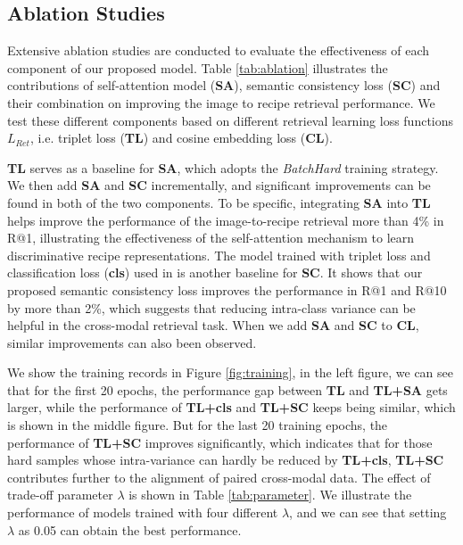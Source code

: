 \documentclass[journal]{IEEEtran}
\begin{document}
\subsection{Ablation Studies}
Extensive ablation studies are conducted to evaluate the effectiveness of each component of our proposed model. Table \ref{tab:ablation} illustrates the contributions of self-attention model (\textbf{SA}), semantic consistency loss (\textbf{SC}) and their combination on improving the image to recipe retrieval performance. We test these different components based on different retrieval learning loss functions $L_{Ret}$, i.e. triplet loss (\textbf{TL}) and cosine embedding loss (\textbf{CL}). 

\textbf{TL} serves as a baseline for \textbf{SA}, which adopts the \emph{BatchHard} \cite{hermans2017defense} training strategy. We then add \textbf{SA} and \textbf{SC} incrementally, and significant improvements can be found in both of the two components. To be specific, integrating \textbf{SA} into \textbf{TL} helps improve the performance of the image-to-recipe retrieval more than 4\% in R@1, illustrating the effectiveness of the self-attention mechanism to learn discriminative recipe representations. The model trained with triplet loss and classification loss (\textbf{cls}) used in \cite{salvador2017learning} is another baseline for \textbf{SC}. It shows that our proposed semantic consistency loss improves the performance in R@1 and R@10 by more than 2\%, which suggests that reducing intra-class variance can be helpful in the cross-modal retrieval task. When we add \textbf{SA} and \textbf{SC} to \textbf{CL}, similar improvements can also been observed.

We show the training records in Figure \ref{fig:training}, in the left figure, we can see that for the first 20 epochs, the performance gap between \textbf{TL} and \textbf{TL+SA} gets larger, while the performance of \textbf{TL+cls} and \textbf{TL+SC} keeps being similar, which is shown in the middle figure. But for the last 20 training epochs, the performance of \textbf{TL+SC} improves significantly, which indicates that for those hard samples whose intra-variance can hardly be reduced by \textbf{TL+cls}, \textbf{TL+SC} contributes further to the alignment of paired cross-modal data. The effect of trade-off parameter $\lambda$ is shown in Table \ref{tab:parameter}. We illustrate the performance of models trained with four different $\lambda$, and we can see that setting $\lambda$ as 0.05 can obtain the best performance.
\end{document}
